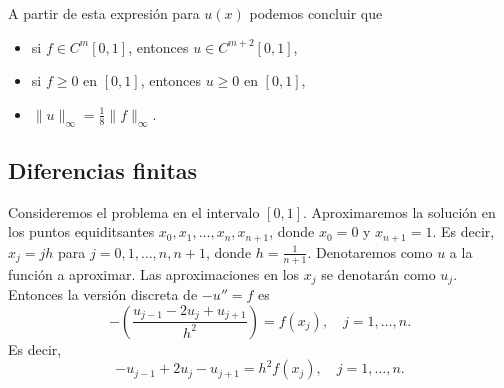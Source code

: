 \documentclass[11pt,letterpaper]{report}
\begin{document}
A partir de esta expresión para $u(x)$ podemos concluir que
\begin{itemize}
  \item
    si $f\in C^{m}[0,1]$, entonces $u\in C^{m+2}[0,1]$,
  \item
    si $f\geq 0$ en $[0,1]$, entonces $u\geq 0$ en $[0,1]$,
  \item
    $\|u\|_{\infty}=\frac{1}{8}\|f\|_\infty$.
\end{itemize}

\subsection{Diferencias finitas}
Consideremos el problema en el intervalo $[0,1]$. Aproximaremos la
solución en los puntos equiditsantes $x_0,x_1,\dots,x_n,x_{n+1}$,
donde $x_0=0$ y $x_{n+1}=1$. Es decir, $x_j=jh$ para
$j=0,1,\dots,n,n+1$, donde $h=\frac{1}{n+1}$.
Denotaremos como $u$ a la función a aproximar. Las aproximaciones en
los $x_j$ se denotarán como $u_j$. Entonces la versión discreta de
$-u''=f$ es
\begin{equation}
  - \left( \frac{u_{j-1}-2u_j+u_{j+1}}{h^{2}} \right)
    =
    f(x_j), \quad j=1,\dots,n
.\end{equation}
Es decir,
\begin{equation}
  - u_{j-1}+2u_j-u_{j+1}
    =
    h^{2} f(x_j), \quad j=1,\dots,n
.\end{equation}
\end{document}
